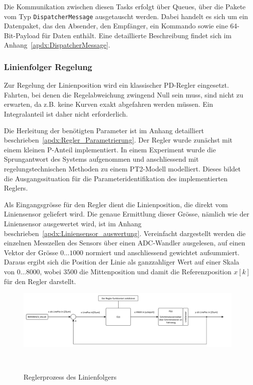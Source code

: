 \documentclass[main.tex]{subfiles} %
\begin{document}
Die Kommunikation zwischen diesen Tasks erfolgt über Queues, über die Pakete
vom Typ \texttt{DispatcherMessage} ausgetauscht werden. Dabei handelt es sich
um ein Datenpaket, das den Absender, den Empfänger, ein Kommando sowie eine
64-Bit-Payload für Daten enthält. Eine detaillierte Beschreibung findet sich im
Anhang~\ref{apdx:DispatcherMessage}.

\subsubsection*{Linienfolger Regelung}

Zur Regelung der Linienposition wird ein klassischer PD-Regler eingesetzt.
Fahrten, bei denen die Regelabweichung zwingend Null sein muss, sind nicht zu
erwarten, da z.B. keine Kurven exakt abgefahren werden müssen. Ein
Integralanteil ist daher nicht erforderlich.

Die Herleitung der benötigten Parameter ist im Anhang detailliert
beschrieben~\ref{apdx:Regler_Parametrierung}. Der Regler wurde zunächst mit
einem kleinen P-Anteil implementiert. In einem Experiment wurde die
Sprungantwort des Systems aufgenommen und anschliessend mit
regelungstechnischen Methoden zu einem PT2-Modell modelliert. Dieses bildet die
Ausgangssituation für die Parameteridentifikation des implementierten Reglers.

Als Eingangsgrösse für den Regler dient die Linienposition, die direkt vom
Liniensensor geliefert wird. Die genaue Ermittlung dieser Grösse, nämlich wie
der Liniensensor ausgewertet wird, ist im Anhang
beschrieben~\ref{apdx:Liniensensor_auswertung}. Vereinfacht dargestellt werden
die einzelnen Messzellen des Sensors über einen ADC-Wandler ausgelesen, auf
einen Vektor der Grösse $0 \dots 1000$ normiert und anschliessend gewichtet
aufsummiert. Daraus ergibt sich die Position der Linie als ganzzahliger Wert
auf einer Skala von $0 \dots 8000$, wobei $3500$ die Mittenposition und damit
die Referenzposition $x[k]$ für den Regler darstellt.

\begin{figure}[H]
    \centering
    \includegraphics[width=1.0\linewidth]{../../Anhang_subfiles/Anhang_Elektronik/fig_Parametrierung_Linienfolgeregler/RegelProzess_Linienfolger.pdf}
    \caption{Reglerprozess des Linienfolgers}~\label{fig:Linienfolger_RegelProzess_ht}
\end{figure}
\end{document}
